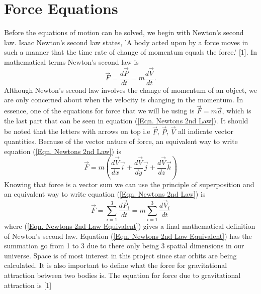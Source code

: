 \documentclass[twocolumn]{article}
\begin{document}
\section{Force Equations}
Before the equations of motion can be solved, we begin with Newton's second law. Isaac Newton's second law states, 'A body acted upon by a force moves in such a manner that the time rate of change of momentum equals the force.' [1]. In mathematical terms Newton's second law is
\begin{equation}\label{Eqn. Newtons 2nd Law}
\Vec{F}=\frac{d\Vec{P}}{dt}=m\frac{d\Vec{V}}{dt}.
\end{equation}
Although Newton's second law involves the change of momentum of an object, we are only concerned about when the velocity is changing in the momentum. In essence, one of the equations for force that we will be using is $\Vec{F}=m\Vec{a}$, which is the last part that can be seen in equation (\ref{Eqn. Newtons 2nd Law}). It should be noted that the letters with arrows on top i.e $\Vec{F}$, $\Vec{P}$, $\Vec{V}$ all indicate vector quantities. Because of the vector nature of force, an equivalent way to write equation (\ref{Eqn. Newtons 2nd Law}) is
\begin{equation}\label{Eqn. Newtons 2nd Law Vector}
\Vec{F}=m(\frac{d\Vec{V}}{dx}\Vec{i} + \frac{d\Vec{V}}{dy}\Vec{j} + \frac{d\Vec{V}}{dz}\Vec{k})
\end{equation}
Knowing that force is a vector sum we can use the principle of superposition and an equivalent way to write equation (\ref{Eqn. Newtons 2nd Law}) is
\begin{equation}\label{Eqn. Newtons 2nd Law Equivalent}
\Vec{F}=\sum_{i=1}^{3} \frac{d\Vec{P}_i}{dt}=m\sum_{i=1}^{3} \frac{d\Vec{V}_i}{dt}
\end{equation}
where (\ref{Eqn. Newtons 2nd Law Equivalent}) gives a final mathematical definition of Newton's second law. Equation (\ref{Eqn. Newtons 2nd Law Equivalent}) has the summation go from 1 to 3 due to there only being 3 spatial dimensions in our universe. Space is of most interest in this project since star orbits are being calculated. It is also important to define what the force for gravitational attraction between two bodies is. The equation for force due to gravitational attraction is [1]
\end{document}
